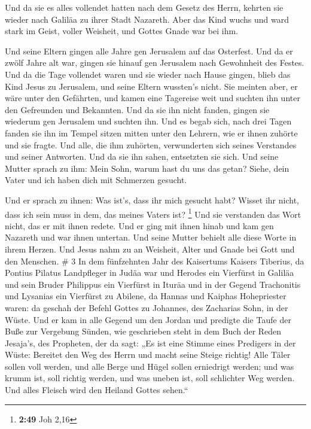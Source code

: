  Und da sie es alles vollendet hatten nach dem Gesetz des
Herrn, kehrten sie wieder nach Galiläa zu ihrer Stadt Nazareth.
 Aber das Kind wuchs und ward stark im Geist, voller
Weisheit, und Gottes Gnade war bei ihm.

 Und seine Eltern gingen alle Jahre gen Jerusalem auf das
Osterfest.  Und da er zwölf Jahre alt war, gingen sie
hinauf gen Jerusalem nach Gewohnheit des Festes.  Und da
die Tage vollendet waren und sie wieder nach Hause gingen, blieb das
Kind Jesus zu Jerusalem, und seine Eltern wussten's nicht.
 Sie meinten aber, er wäre unter den Gefährten, und kamen
eine Tagereise weit und suchten ihn unter den Gefreunden und Bekannten.
 Und da sie ihn nicht fanden, gingen sie wiederum gen
Jerusalem und suchten ihn.  Und es begab sich, nach drei
Tagen fanden sie ihn im Tempel sitzen mitten unter den Lehrern, wie er
ihnen zuhörte und sie fragte.  Und alle, die ihm
zuhörten, verwunderten sich seines Verstandes und seiner Antworten.
 Und da sie ihn sahen, entsetzten sie sich. Und seine
Mutter sprach zu ihm: Mein Sohn, warum hast du uns das getan? Siehe,
dein Vater und ich haben dich mit Schmerzen gesucht.

 Und er sprach zu ihnen: Was ist's, dass ihr mich gesucht
habt? Wisset ihr nicht, dass ich sein muss in dem, das meines Vaters
ist? \footnote{\textbf{2:49} Joh 2,16}  Und sie
verstanden das Wort nicht, das er mit ihnen redete.  Und
er ging mit ihnen hinab und kam gen Nazareth und war ihnen untertan. Und
seine Mutter behielt alle diese Worte in ihrem Herzen. 
Und Jesus nahm zu an Weisheit, Alter und Gnade bei Gott und den
Menschen. \# 3  In dem fünfzehnten Jahr des Kaisertums
Kaisers Tiberius, da Pontius Pilatus Landpfleger in Judäa war und
Herodes ein Vierfürst in Galiläa und sein Bruder Philippus ein Vierfürst
in Ituräa und in der Gegend Trachonitis und Lysanias ein Vierfürst zu
Abilene,  da Hannas und Kaiphas Hohepriester waren: da
geschah der Befehl Gottes zu Johannes, des Zacharias Sohn, in der Wüste.
 Und er kam in alle Gegend um den Jordan und predigte die
Taufe der Buße zur Vergebung Sünden,  wie geschrieben
steht in dem Buch der Reden Jesaja's, des Propheten, der da sagt: „Es
ist eine Stimme eines Predigers in der Wüste: Bereitet den Weg des Herrn
und macht seine Steige richtig!  Alle Täler sollen voll
werden, und alle Berge und Hügel sollen erniedrigt werden; und was krumm
ist, soll richtig werden, und was uneben ist, soll schlichter Weg
werden.  Und alles Fleisch wird den Heiland Gottes
sehen.``

